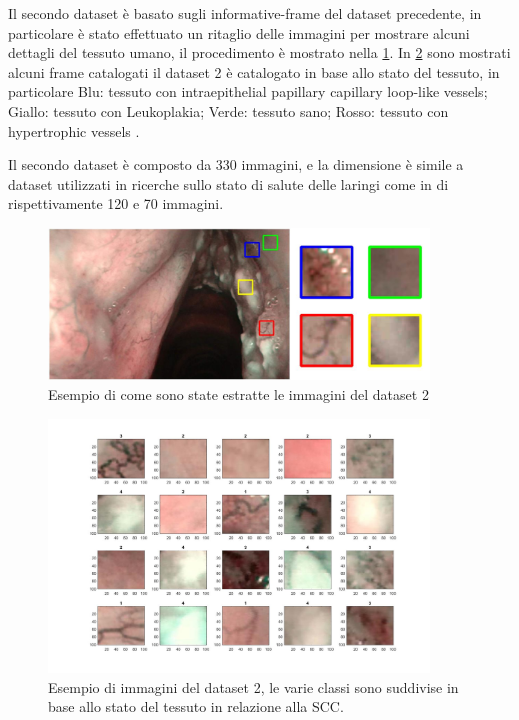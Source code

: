 Il secondo dataset è basato sugli informative-frame del dataset precedente, in particolare è stato effettuato un ritaglio delle immagini per mostrare   alcuni dettagli del tessuto umano, il procedimento è mostrato nella \cref{fig:dataset2}. In \cref{fig:dataset2ml} sono mostrati alcuni frame catalogati il dataset 2 è catalogato in base allo stato del tessuto, in particolare Blu: tessuto con intraepithelial papillary capillary loop-like vessels; Giallo: tessuto con Leukoplakia;
Verde: tessuto sano; Rosso: tessuto con hypertrophic vessels \cite{moccia_larynge}.

Il secondo dataset è composto da 330 immagini, e la dimensione è simile a dataset utilizzati in ricerche sullo stato di salute delle laringi come in \cite{narbalata_larynge} \cite{turkmen_larynge} di rispettivamente 120 e 70 immagini.

\begin{figure}[ht]
    \centering
    \includegraphics[width=0.9\textwidth]{introduzione/dataset-2.JPG}
    \caption{Esempio di come sono state estratte le immagini del dataset 2}
    \label{fig:dataset2}
\end{figure}

\begin{figure}[ht]
    \centering
    \includegraphics[width=0.9\textwidth]{introduzione/dataset-2-ml.JPG}
    \caption[Esempio di immagini del dataset 2]{Esempio di immagini del dataset 2, le varie classi sono suddivise in base allo stato del tessuto in relazione alla SCC.}
    \label{fig:dataset2ml}
\end{figure}


